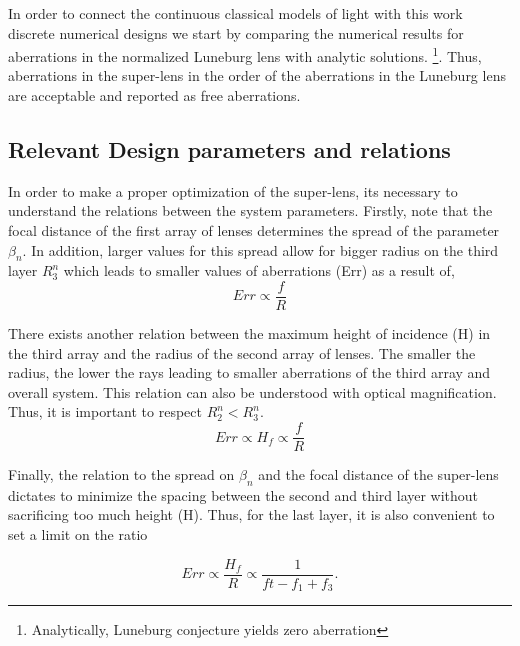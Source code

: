 In order to connect the continuous classical models of light with this work discrete numerical designs we start by comparing the numerical results for aberrations in the normalized Luneburg lens with analytic solutions. \footnote{Analytically, Luneburg conjecture yields zero aberration}. Thus, aberrations in the super-lens in the order of the aberrations in the Luneburg lens are acceptable and reported as free aberrations. \\

\subsection{Relevant Design parameters and relations}
In order to make a proper optimization of the super-lens, its necessary to understand the relations between the system parameters. Firstly, note that the  focal distance of the first array of lenses determines the spread of the parameter $\beta_n$. In addition, larger values for this spread allow for bigger radius on the third layer $R_3^n$  which leads to smaller values of aberrations (Err) as a result of,
\begin{equation}
    Err \propto \frac{f}{R}
\end{equation}

There exists another relation between the maximum height of incidence (H) in the third array and the radius of the second array of lenses. The smaller the radius, the lower the rays leading to smaller aberrations of the third array and overall system. This relation can also be understood with optical magnification. Thus, it is important to respect $R_2^n < R_3^n$.
\begin{equation}
    Err \propto H_f \propto \frac{f}{R}
\end{equation}

Finally, the relation to the spread on $\beta_n$  and the focal distance of the super-lens dictates to minimize the spacing between the second and third layer without sacrificing too much height (H). Thus, for the last layer, it is also convenient to set a limit on the ratio

\begin{equation}
    Err  \propto \frac{H_f}{R} \propto  \frac{1}{ft-f_1+f_3}.
    \label{eq:errproptoh}
\end{equation}


